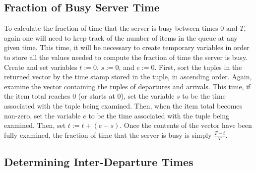 \documentclass[11pt, oneside]{article}
\begin{document}
\subsection{Fraction of Busy Server Time}
To calculate the fraction of time that the server is busy between times $0 \text{ and } T$, again one will need to keep track of the number of items in the queue at any given time. This time, it will be necessary to create temporary variables in order to store all the values needed to compute the fraction of time the server is busy. Create and set variables $t:=0$, $s:=0$, and $e:=0$. First, sort the tuples in the returned vector by the time stamp stored in the tuple, in ascending order. Again, examine the vector containing the tuples of departures and arrivals. This time, if the item total reaches $0$ (or starts at $0$), set the variable $s$ to be the time associated with the tuple being examined. Then, when the item total becomes non-zero, set the variable $e$ to be the time associated with the tuple being examined. Then, set $t:=t+(e-s)$. Once the contents of the vector have been fully examined, the fraction of time that the server is busy is simply $\frac{T-t}{T}$.

\subsection{Determining Inter-Departure Times}
\subsection{}
\subsection{}
\subsection{}
\end{document}
